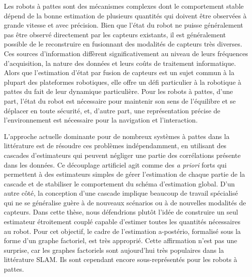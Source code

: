 Les robots à pattes sont des mécanismes complexes dont le comportement stable dépend de la bonne estimation de plusieurs quantités 
qui doivent être observées à grande vitesse et avec précision. Bien que l'état du robot ne puisse généralement pas être observé directement par 
les capteurs existants, il est généralement possible de le reconstruire en fusionnant des modalités de capteurs très diverses.
Ces sources d'information diffèrent significativement au niveau de leurs fréquences d'acquisition, la nature des données et leurs coûts de traitement informatique.
Alors que l'estimation d'état par fusion de capteurs est un sujet commun à la plupart des plateformes robotiques, elle offre un défi particulier à la 
robotique à pattes du fait de leur dynamique particulière.
Pour les robots à pattes, d'une part, l'état du robot est nécessaire pour maintenir son sens de l'équilibre et se déplacer en toute sécurité, et, 
d'autre part, une représentation précise de l'environnement est nécessaire pour la navigation et l'interaction.

L'approche actuelle dominante pour de nombreux systèmes à pattes dans la littérature est de résoudre ces problèmes
indépendamment, en utilisant des cascades d'estimateurs qui peuvent négliger une partie des corrélations présente dans les données.
Ce découplage artificiel agit comme des \textit{a priori} forts qui permettent à des estimateurs simples de gérer l'estimation de chaque partie de la cascade et de stabiliser 
le comportement du schéma d'estimation global. D'un autre côté, la conception d'une cascade implique beaucoup de travail spécialisé qui ne se généralise guère à de 
nouveaux scénarios ou à de nouvelles modalités de capteurs.
Dans cette thèse, nous défendrions plutôt l'idée de construire un seul estimateur étroitement couplé capable d'estimer toutes les quantités nécessaires au robot.
Pour cet objectif, le cadre de l'estimation a-postério, formalisé sous la forme d'un graphe factoriel, est très approprié. Cette affirmation n'est pas une surprise, 
car les graphes factoriels sont aujourd'hui très populaires dans la littérature SLAM. Ils sont cependant encore sous-représentés pour les robots à pattes.

